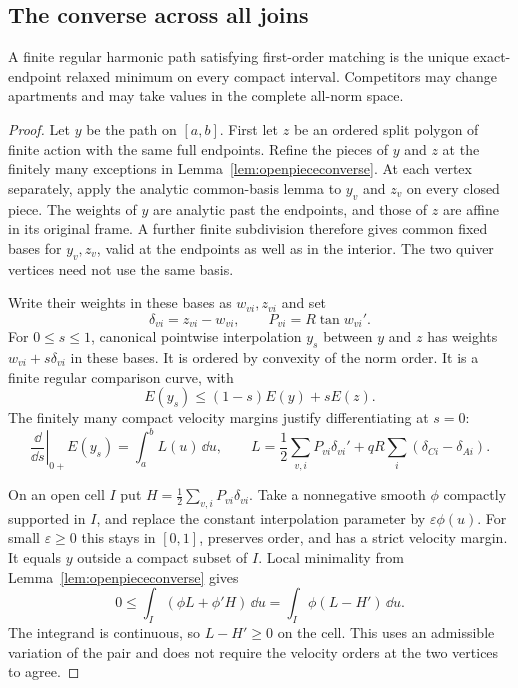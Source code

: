 \subsection{The converse across all joins}

\begin{theorem}\label{thm:finiteintervalconverse}
A finite regular harmonic path satisfying first-order matching
is the unique exact-endpoint relaxed minimum on every compact
interval. Competitors may change apartments and may take values
in the complete all-norm space.
\end{theorem}

\begin{proof}
Let $y$ be the path on $[a,b]$. First let $z$ be an ordered split
polygon of finite action with the same full endpoints.
Refine the pieces of $y$ and $z$ at the finitely many exceptions
in Lemma~\ref{lem:openpiececonverse}. At each vertex separately,
apply the analytic common-basis lemma to $y_v$ and $z_v$ on
every closed piece. The weights of $y$ are analytic past the
endpoints, and those of $z$ are affine in its original frame.
A further finite subdivision therefore gives common fixed bases
for $y_v,z_v$, valid at the endpoints as well as in the interior.
The two quiver vertices need not use the same basis.

Write their weights in these bases as $w_{vi},z_{vi}$ and set
\[
 \delta_{vi}=z_{vi}-w_{vi},\qquad P_{vi}=R\tan w_{vi}'.
\]
For $0\le s\le1$, canonical pointwise interpolation $y_s$
between $y$ and $z$ has weights $w_{vi}+s\delta_{vi}$ in
these bases. It is ordered by convexity of the norm order.
It is a finite regular comparison curve, with
\[
 E(y_s)\le(1-s)E(y)+sE(z).
\]
The finitely many compact velocity margins justify
differentiating at $s=0$:
\begin{equation}\label{eq:globalfirstvariation}
 \left.\frac{\dd}{\dd s}\right|_{0+}E(y_s)
 =\int_a^b L(u)\,\dd u,\qquad
 L=\frac12\sum_{v,i}P_{vi}\delta_{vi}'
                   +qR\sum_i(\delta_{Ci}-\delta_{Ai}).
\end{equation}

On an open cell $I$ put $H=\frac12\sum_{v,i}P_{vi}\delta_{vi}$.
Take a nonnegative smooth $\phi$ compactly supported in $I$,
and replace the constant interpolation parameter by
$\varepsilon\phi(u)$. For small $\varepsilon\ge0$ this stays
in $[0,1]$, preserves order, and has a strict velocity margin.
It equals $y$ outside a compact subset of $I$. Local minimality
from Lemma~\ref{lem:openpiececonverse} gives
\[
 0\le\int_I(\phi L+\phi'H)\,\dd u
       =\int_I\phi(L-H')\,\dd u.
\]
The integrand is continuous, so $L-H'\ge0$ on the cell.
This uses an admissible variation of the pair and does not
require the velocity orders at the two vertices to agree.


\end{proof}
